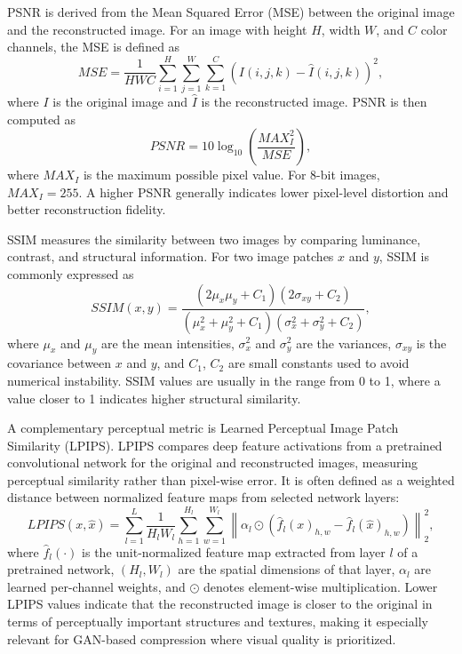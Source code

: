 PSNR is derived from the Mean Squared Error (MSE) between the original image and the reconstructed image. For an image with height $H$, width $W$, and $C$ color channels, the MSE is defined as
\begin{equation}
MSE = \frac{1}{HWC}\sum_{i=1}^{H}\sum_{j=1}^{W}\sum_{k=1}^{C}\left(I(i,j,k)-\hat{I}(i,j,k)\right)^2,
\end{equation}
where $I$ is the original image and $\hat{I}$ is the reconstructed image. PSNR is then computed as
\begin{equation}
PSNR = 10\log_{10}\left(\frac{MAX_I^2}{MSE}\right),
\end{equation}
where $MAX_I$ is the maximum possible pixel value. For 8-bit images, $MAX_I = 255$. A higher PSNR generally indicates lower pixel-level distortion and better reconstruction fidelity.

SSIM measures the similarity between two images by comparing luminance, contrast, and structural information. For two image patches $x$ and $y$, SSIM is commonly expressed as
\begin{equation}
SSIM(x,y) = \frac{(2\mu_x\mu_y + C_1)(2\sigma_{xy} + C_2)}{(\mu_x^2 + \mu_y^2 + C_1)(\sigma_x^2 + \sigma_y^2 + C_2)},
\end{equation}
where $\mu_x$ and $\mu_y$ are the mean intensities, $\sigma_x^2$ and $\sigma_y^2$ are the variances, $\sigma_{xy}$ is the covariance between $x$ and $y$, and $C_1$, $C_2$ are small constants used to avoid numerical instability. SSIM values are usually in the range from 0 to 1, where a value closer to 1 indicates higher structural similarity.

A complementary perceptual metric is Learned Perceptual Image Patch Similarity (LPIPS). LPIPS compares deep feature activations from a pretrained convolutional network for the original and reconstructed images, measuring perceptual similarity rather than pixel-wise error. It is often defined as a weighted distance between normalized feature maps from selected network layers:
\begin{equation}
LPIPS(x,\hat{x}) = \sum_{l=1}^{L} \frac{1}{H_lW_l}\sum_{h=1}^{H_l}\sum_{w=1}^{W_l} \left\| \alpha_l \odot \left(\hat{f}_l(x)_{h,w} - \hat{f}_l(\hat{x})_{h,w}\right) \right\|_2^2,
\end{equation}
where $\hat{f}_l(\cdot)$ is the unit-normalized feature map extracted from layer $l$ of a pretrained network, $(H_l,W_l)$ are the spatial dimensions of that layer, $\alpha_l$ are learned per-channel weights, and $\odot$ denotes element-wise multiplication. Lower LPIPS values indicate that the reconstructed image is closer to the original in terms of perceptually important structures and textures, making it especially relevant for GAN-based compression where visual quality is prioritized.

